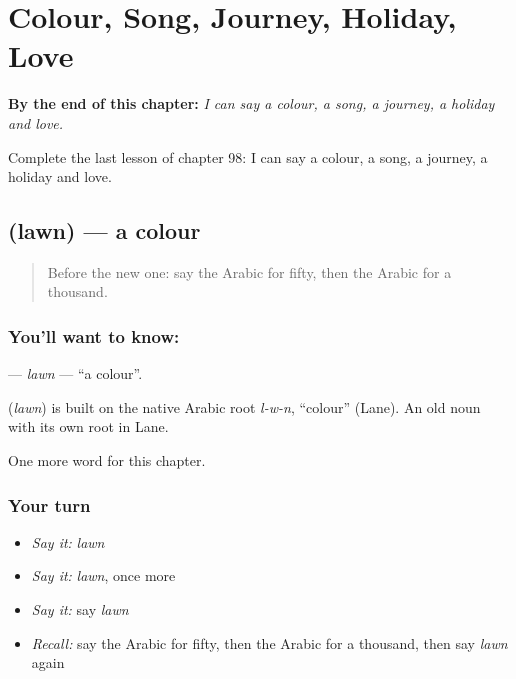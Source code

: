 
\chapter{Colour, Song, Journey, Holiday, Love}
\label{ch:ar-colour-song-journey-holiday-love}

\begin{chapteropening}
\textbf{By the end of this chapter:} \emph{I can say a colour, a song, a journey, a holiday and love.}

Complete the last lesson of chapter 98: I can say a colour, a song, a journey, a holiday and love.
\end{chapteropening}

\section[\texorpdfstring{\ar{لون} (lawn)}{لون (lawn)}]{ (lawn) — a colour}

\label{lesson:AR-C98-lawn}



\begin{quote}
Before the new one: say the Arabic for fifty, then the Arabic for a thousand.
\end{quote}

\subsection*{You'll want to know: }
\textbf{} — \emph{lawn} — \textquotedblleft{}a colour\textquotedblright{}.

\begin{cousinweb}
\textbf{} (\emph{lawn}) is built on the native Arabic root \emph{l-w-n}, \textquotedblleft{}colour\textquotedblright{} (Lane). An old noun with its own root in Lane.
\end{cousinweb}

\begin{grammarlens}[title={What you've built}]
One more word for this chapter.
\end{grammarlens}

\subsection*{Your turn}
\begin{itemize}
\raggedright
  \item \emph{Say it:} \emph{lawn}
  \item \emph{Say it:} \emph{lawn}, once more
  \item \emph{Say it:} say \emph{lawn}
  \item \emph{Recall:} say the Arabic for fifty, then the Arabic for a thousand, then say \emph{lawn} again
\end{itemize}

